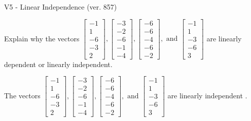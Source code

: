 \begin{exercise}
  \begin{exerciseTitle}V5 - Linear Independence (ver. 857)\end{exerciseTitle}
  \begin{exerciseStatement}
    Explain why the vectors \(\left[\begin{array}{r}
-1 \\
1 \\
-6 \\
-3 \\
2
\end{array}\right] , \left[\begin{array}{r}
-3 \\
-2 \\
-6 \\
-1 \\
-4
\end{array}\right] , \left[\begin{array}{r}
-6 \\
-6 \\
-4 \\
-6 \\
-2
\end{array}\right] , \text{ and } \left[\begin{array}{r}
-1 \\
1 \\
-3 \\
-6 \\
3
\end{array}\right]\) are linearly dependent or linearly independent.	


  \end{exerciseStatement}
  \begin{exerciseAnswer}
   The vectors \(\left[\begin{array}{r}
-1 \\
1 \\
-6 \\
-3 \\
2
\end{array}\right] , \left[\begin{array}{r}
-3 \\
-2 \\
-6 \\
-1 \\
-4
\end{array}\right] , \left[\begin{array}{r}
-6 \\
-6 \\
-4 \\
-6 \\
-2
\end{array}\right] , \text{ and } \left[\begin{array}{r}
-1 \\
1 \\
-3 \\
-6 \\
3
\end{array}\right]\) are 
  	 linearly independent  .
  


  \end{exerciseAnswer}
\end{exercise}